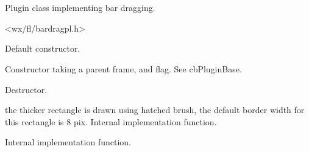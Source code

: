 %
%


\section{}\label{cbbardragplugin}


Plugin class implementing bar dragging.




<wx/fl/bardragpl.h>




\label{cbbardragplugincbbardragplugin}


Default constructor.



Constructor taking a parent frame, and flag. See cbPluginBase.


\label{cbbardragplugindtor}


Destructor.


\label{cbbardragpluginadjusthintrect}


the thicker rectangle is drawn using hatched brush,
the default border width for this rectangle is 8 pix.
Internal implementation function.


\label{cbbardragplugincalconscreendims}


Internal implementation function.


\label{cbbardragpluginclipposinframe}


